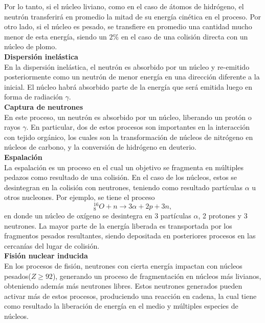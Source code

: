 Por lo tanto, si el núcleo liviano, como en el caso de átomos de hidrógeno, el neutrón transferirá en promedio la mitad de su energía cinética en el proceso. Por otro lado, si el núcleo es pesado, se transfiere en promedio una cantidad mucho menor de esta energía, siendo un $2\%$ en el caso de una colisión directa con un núcleo de plomo.\\

\textbf{Dispersión inelástica}\\

En la dispersión inelástica, el neutrón es absorbido por un núcleo y re-emitido posteriormente como un neutrón de menor energía en una dirección diferente a la inicial. El núcleo habrá absorbido parte de la energía que será emitida luego en forma de radiación $\gamma$.\\

\textbf{Captura de neutrones}\\

En este proceso, un neutrón es absorbido por un núcleo, liberando un protón o rayos $\gamma$. En particular, dos de estos procesos son importantes en la interacción con tejido orgánico, los cuales son la transformación de núcleos de nitrógeno en núcleos de carbono, y la conversión de hidrógeno en deuterio. \\

\textbf{Espalación}\\

La espalación es un proceso en el cual un objetivo se fragmenta en múltiples pedazos como resultado de una colisión. En el caso de los núcleos, estos se desintegran en la colisión con neutrones, teniendo como resultado partículas $\alpha$ u otros nucleones. Por ejemplo, se tiene el proceso
\begin{equation}
	^{16}_8O + n\rightarrow 3\alpha+2p+3n,
\end{equation}
en donde un núcleo de oxígeno se desintegra en 3 partículas $\alpha$, 2 protones y 3 neutrones. La mayor parte de la energía liberada es transportada por los fragmentos pesados resultantes, siendo depositada en posteriores procesos en las cercanías del lugar de colisión.\\ 

\textbf{Fisión nuclear inducida}\\

En los procesos de fisión, neutrones con cierta energía impactan con núcleos pesados($Z\geq 92$), generando un proceso de fragmentación en núcleos más livianos, obteniendo además más neutrones libres. Estos neutrones generados pueden activar más de estos procesos, produciendo una reacción en cadena, la cual tiene como resultado la liberación de energía en el medio y múltiples especies de núcleos. 
   
